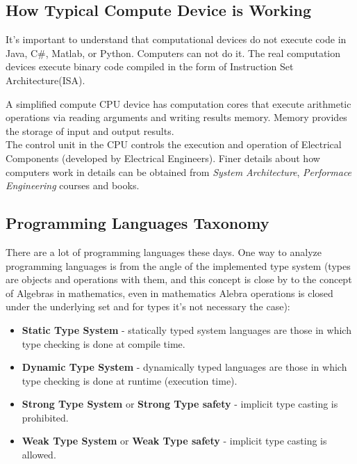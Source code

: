 \documentclass[
]{article}
\begin{document}
\hypertarget{how-typical-compute-device-is-working}{%
\subsection{How Typical Compute Device is
Working}\label{how-typical-compute-device-is-working}}

It's important to understand that computational devices do not execute
code in Java, C\#, Matlab, or Python. Computers can not do it. The real
computation devices execute binary code compiled in the form of
Instruction Set Architecture(ISA).

A simplified compute CPU device has computation cores that execute
arithmetic operations via reading arguments and writing results memory.
Memory provides the storage of input and output results.\\
The control unit in the CPU controls the execution and operation of
Electrical Components (developed by Electrical Engineers). Finer details
about how computers work in details can be obtained from \emph{System
Architecture}, \emph{Performace Engineering} courses and books.

\hypertarget{programming-languages-taxonomy}{%
\subsection{Programming Languages
Taxonomy}\label{programming-languages-taxonomy}}

There are a lot of programming languages these days. One way to analyze
programming languages is from the angle of the implemented type system
(types are objects and operations with them, and this concept is close
by to the concept of Algebras in mathematics, even in mathematics Alebra
operations is closed under the underlying set and for types it's not
necessary the case):

\begin{itemize}
\item
  \textbf{Static Type System} - statically typed system languages are
  those in which type checking is done at compile time.
\item
  \textbf{Dynamic Type System} - dynamically typed languages are those
  in which type checking is done at runtime (execution time).
\item
  \textbf{Strong Type System} or \textbf{Strong Type safety} - implicit
  type casting is prohibited.
\item
  \textbf{Weak Type System} or \textbf{Weak Type safety} - implicit type
  casting is allowed.
\end{itemize}
\end{document}
